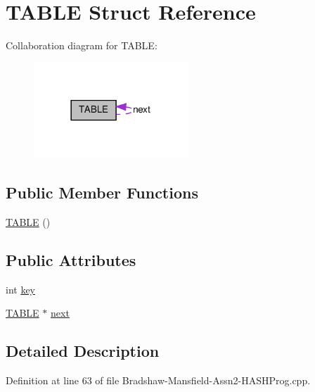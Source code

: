 \hypertarget{struct_t_a_b_l_e}{
\section{TABLE Struct Reference}
\label{struct_t_a_b_l_e}
}


Collaboration diagram for TABLE:\nopagebreak
\begin{figure}[H]
\begin{center}
\leavevmode
\includegraphics[width=165pt]{struct_t_a_b_l_e__coll__graph}
\end{center}
\end{figure}
\subsection*{Public Member Functions}
\begin{DoxyCompactItemize}
\item 
\hyperlink{struct_t_a_b_l_e_a34ca35df0c02a42a2667b918ac8949b9}{TABLE} ()
\end{DoxyCompactItemize}
\subsection*{Public Attributes}
\begin{DoxyCompactItemize}
\item 
int \hyperlink{struct_t_a_b_l_e_aca8b660b95cd57c4ac1985b870651ce6}{key}
\item 
\hyperlink{struct_t_a_b_l_e}{TABLE} $\ast$ \hyperlink{struct_t_a_b_l_e_a8a37d60b9f88048f2067d405c253428c}{next}
\end{DoxyCompactItemize}


\subsection{Detailed Description}


Definition at line 63 of file Bradshaw-\/Mansfield-\/Assn2-\/HASHProg.cpp.



